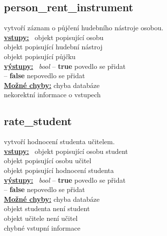 \documentclass[a4paper, 11pt, twocolumn]{article}
\begin{document}
\newpage


\subsection{person\_rent\_instrument}\label{personux5frentux5finstrument}
\vspace*{-0.3cm}
vytvoří záznam o půjčení hudebního nástroje osobou. \\
\noindent \underline{\textbf{vstupy:}} \, objekt popisující osobu  \\
\noindent \hspace*{1.4cm} objekt popisující hudební nástroj  \\
\noindent \hspace*{1.4cm} objekt popisující půjčku  \\
\noindent \underline{\textbf{výstupy:}} \, \textit{bool} -- \textbf{true} povedlo se přidat \\
\hspace*{2.35cm} -- \textbf{false} nepovedlo se přidat  \\
\underline{\textbf{Možné chyby:}} chyba databáze \\
\hspace*{1.4cm} nekorektní informace o vstupech

\subsection{rate\_student}\label{rateux5fstudent}
\vspace*{-0.3cm}
vytvoří hodnocení studenta učitelem. \\
\noindent \underline{\textbf{vstupy:}} \, objekt popisující osobu student  \\
\noindent \hspace*{1.4cm} objekt popisující osobu učitel  \\
\noindent \hspace*{1.4cm} objekt popisující hodnocení studenta  \\
\noindent \underline{\textbf{výstupy:}} \, \textit{bool} -- \textbf{true} povedlo se přidat \\
\hspace*{2.35cm} -- \textbf{false} nepovedlo se přidat  \\
\underline{\textbf{Možné chyby:}} chyba databáze \\
\noindent\hspace*{1.4cm} objekt studenta není student \\
\hspace*{1.4cm} objekt učitele není učitel \\
\hspace*{1.4cm} chybné vstupní informace \\
\end{document}
